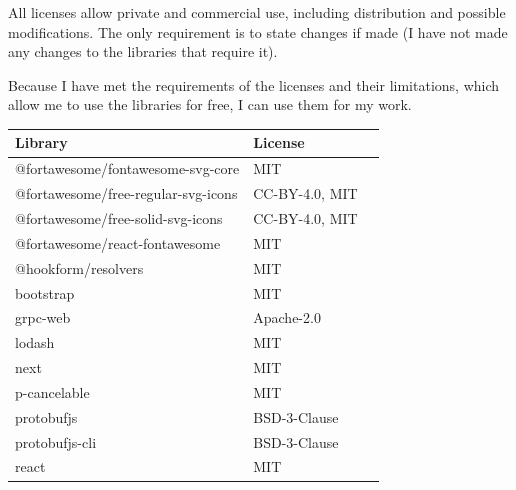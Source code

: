 All licenses allow private and commercial use, including distribution and possible modifications.
The only requirement is to
state changes if made (I have not made any changes to the libraries that require it).


Because I have met the requirements of the licenses and their limitations, which allow me to use the libraries for free, I can use them for my work.

\newcommand{\library}[1]{%
    #1\tablefootnote{\url{https://www.npmjs.com/package/#1}}%
}

\newpage
\begin{table}[hbt!]
    \centering
    \captionsetup{justification=centering}
    \begin{tabular}{|l|l|l|}
        \hline
        \textbf{Library}                              & \textbf{License} \\ \hline
        \library{@fortawesome/fontawesome-svg-core}   & MIT              \\ \hline
        \library{@fortawesome/free-regular-svg-icons} & CC-BY-4.0, MIT   \\ \hline
        \library{@fortawesome/free-solid-svg-icons}   & CC-BY-4.0, MIT   \\ \hline
        \library{@fortawesome/react-fontawesome}      & MIT              \\ \hline
        \library{@hookform/resolvers}                 & MIT              \\ \hline
        \library{bootstrap}                           & MIT              \\ \hline
        \library{grpc-web}                            & Apache-2.0       \\ \hline
        \library{lodash}                              & MIT              \\ \hline
        \library{next}                                & MIT              \\ \hline
        \library{p-cancelable}                        & MIT              \\ \hline
        \library{protobufjs}                          & BSD-3-Clause     \\ \hline
        \library{protobufjs-cli}                      & BSD-3-Clause     \\ \hline
        \library{react}                               & MIT              \\ \hline

\end{tabular}
\end{table}
